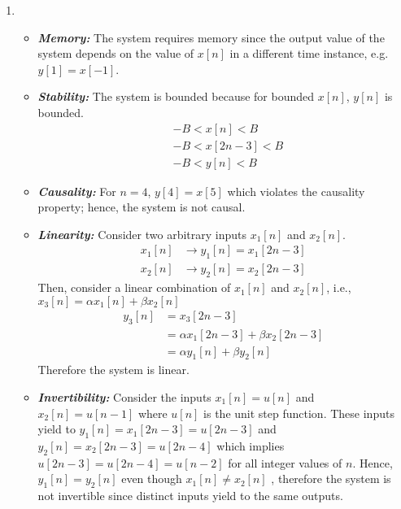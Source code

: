 \documentclass[10pt,a4paper, margin=1in]{article}
\begin{document}
\begin{enumerate}
\begin{enumerate}
\begin{itemize}
	\end{itemize}
    \item %
	\begin{itemize}
		\item \textbf{\textit{Memory:}} The system requires memory since the output value of the system depends on the value of $x[n]$ in a different time instance, e.g. $y[1] = x[-1]$.
		\item \textbf{\textit{Stability:}} The system is bounded because for bounded $x[n]$, $y[n]$ is bounded.
		\begin{equation}
		\begin{split}
			& -B < x[n] < B \\
			& -B < x[2n-3] < B \\
			& -B < y[n] < B 
		\end{split}
		\end{equation}
		\item \textbf{\textit{Causality:}} For $n = 4$, $y[4] = x[5]$ which violates the causality property; hence, the system is not causal.
		\item \textbf{\textit{Linearity:}} Consider two arbitrary inputs $x_1[n]$ and $x_2[n]$.
		\begin{equation}
		\begin{split}
			x_1[n] & \rightarrow y_1[n] = x_1[2n-3]\\
			x_2[n] & \rightarrow y_2[n] = x_2[2n-3]
		\end{split}
		\end{equation}
		Then, consider a linear combination of $x_1[n]$ and $x_2[n]$, i.e., $x_3[n]=\alpha x_1[n] + \beta x_2[n]$
		\begin{equation}
		\begin{split}
			y_3[n] & = x_3[2n - 3]\\
			& = \alpha x_1[2n - 3] + \beta x_2[2n - 3]\\
			& = \alpha y_1[n] + \beta y_2[n]
		\end{split}
		\end{equation}
		Therefore the system is linear.
		\item \textbf{\textit{Invertibility:}} Consider the inputs $x_1[n]=u[n]$ and $x_2[n]=u[n-1]$ where $u[n]$ is the unit step function. These inputs yield to $y_1[n]=x_1[2n-3]=u[2n-3]$ and $y_2[n]=x_2[2n-3]=u[2n-4]$ which implies $u[2n-3]=u[2n-4]=u[n-2]$ for all integer values of $n$. Hence, $y_1[n]=y_2[n]$ even though $x_1[n]\neq x_2[n]$ , therefore the system is not invertible since distinct inputs yield to the same outputs.
		

\end{itemize}
\end{enumerate}
\end{enumerate}
\end{document}
